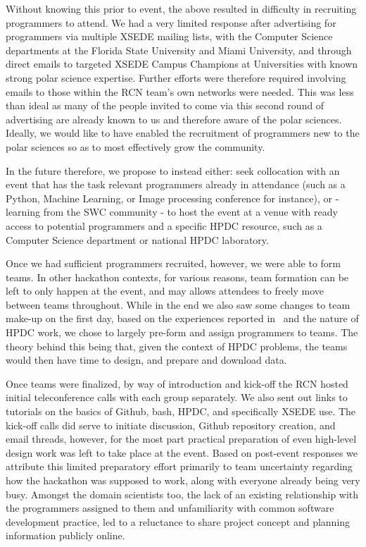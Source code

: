 \documentclass[conference]{IEEEtran}
\begin{document}
Without knowing this prior to event, the above resulted in difficulty in recruiting programmers to attend.  We had a very limited response after advertising for programmers via multiple XSEDE mailing lists, with the Computer Science departments at the Florida State University and Miami University, and through direct emails to targeted XSEDE Campus Champions at Universities with known strong polar science expertise. Further efforts were therefore required involving emails to those within the RCN team's own networks were needed. This was less than ideal as many of the people invited to come via this second round of advertising are already known to us and therefore aware of the polar sciences. Ideally, we would like to have enabled the recruitment of programmers new to the polar sciences so as to most effectively grow the community.  

In the future therefore, we propose to instead either: seek collocation with an event that has the task relevant programmers already in attendance (such as a Python, Machine Learning, or Image processing conference for instance), or - learning from the SWC community - to host the event at a venue with ready access to potential programmers and a specific HPDC resource, such as a Computer Science department or national HPDC laboratory.

Once we had sufficient programmers recruited, however, we were able to form teams. In other hackathon contexts, for various reasons, team formation can be left to only happen at the event, and may allows attendees to freely move between teams throughout. While in the end we also saw some changes to team make-up on the first day, based on the experiences reported in~\cite{mattmann2015} and the nature of HPDC work, we chose to largely pre-form and assign programmers to teams.  The theory behind this being that, given the context of HPDC problems, the teams would then have time to design, and prepare and download data.

Once teams were finalized, by way of introduction and kick-off the RCN hosted initial teleconference calls with each group separately.  We also sent out links to tutorials on the basics of Github, bash, HPDC, and specifically XSEDE use. The kick-off calls did serve to initiate discussion, Github repository creation, and email threads, however, for the most part practical preparation of even high-level design work was left to take place at the event.  Based on post-event responses we attribute this limited preparatory effort primarily to team uncertainty regarding how the hackathon was supposed to work, along with everyone already being very busy.  Amongst the domain scientists too, the lack of an existing relationship with the programmers assigned to them and unfamiliarity with common software development practice, led to a reluctance to share project concept and planning information publicly online.
\end{document}
